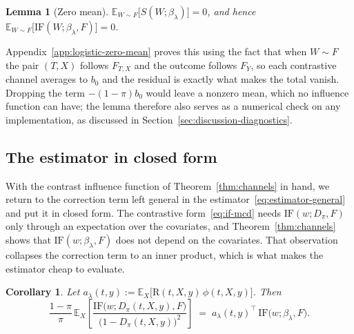 \documentclass[11pt]{article}
\theoremstyle{plain}
\newtheorem{lem}{Lemma}
\newtheorem{corollary}{Corollary}
\theoremstyle{definition}
\theoremstyle{remark}
\newcommand{\pE}{\ensuremath{\mathbb{E}}}
\newcommand{\ratio}{\ensuremath{\pi}}
\newcommand{\contrast}{D_{\ratio}}
\newcommand{\DensityRatio}{\text{R}}
\newcommand{\IF}{\mathrm{IF}}
\newcommand{\score}{S}
\begin{document}
\begin{lem}[Zero mean]
\label{lem:zero-mean}
$\pE_{W \sim F}\big[\score(W;\beta_\lambda)\big] = 0$, and hence
$\pE_{W \sim F}\big[\IF(W;\beta_\lambda,F)\big] = 0$.
\end{lem}

Appendix~\ref{app:logistic-zero-mean} proves this using the fact that when $W \sim F$ the pair
$(T,X)$ follows $F_{T,X}$ and the outcome follows $F_Y$, so each contrastive channel averages
to $b_0$ and the residual is exactly what makes the total vanish. Dropping the term
$-(1-\ratio)b_0$ would leave a nonzero mean, which no influence function can have; the lemma
therefore also serves as a numerical check on any implementation, as discussed in
Section~\ref{sec:discussion-diagnostics}.

\subsection{The estimator in closed form}
\label{sec:mcd-estimator}

With the contrast influence function of Theorem~\ref{thm:channels} in hand, we return to the
correction term left general in the estimator~\eqref{eq:estimator-general} and put it in closed
form. The contrastive form~\eqref{eq:if-mcd} needs $\IF(w;\contrast,F)$ only through an
expectation over the covariates, and Theorem~\ref{thm:channels} shows that
$\IF(w;\beta_\lambda,F)$ does not depend on the covariates. That observation collapses the
correction term to an inner product, which is what makes the estimator cheap to evaluate.

\begin{corollary}
\label{cor:collapse}
Let $a_\lambda(t,y) := \pE_X\big[ \DensityRatio(t,X,y)\,\phi(t,X,y) \big]$. Then
\begin{equation}
\frac{1-\ratio}{\ratio}\,
\pE_X\!\left[ \frac{\IF\big(w;\contrast(t,X,y),F\big)}{\big(1-\contrast(t,X,y)\big)^{2}} \right]
\;=\; a_\lambda(t,y)^\top\, \IF\big(w;\beta_\lambda,F\big).
\label{eq:collapse}
\end{equation}
\end{corollary}
\end{document}
